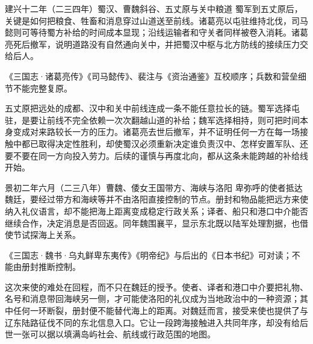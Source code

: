 \begin{event}{}{建兴十二年（二三四年）}{蜀汉、曹魏}{斜谷、五丈原与关中粮道}
蜀军到五丈原后，关键是如何把粮食、牲畜和消息穿过山道送至前线。诸葛亮以屯驻维持北伐，司马懿则可等待蜀方补给的时间成本显现；沿线运输者和守关者同样被卷入消耗。诸葛亮死后撤军，说明道路没有自然通向关中，并把蜀汉中枢与北方防线的接续压力交给后人。

\begin{sourcenote}
《三国志·诸葛亮传》《司马懿传》、裴注与《资治通鉴》互校顺序；兵数和营垒细节不能完整复原。
\end{sourcenote}

五丈原把远处的成都、汉中和关中前线连成一条不能任意拉长的链。蜀军选择屯驻，是要让前线不完全依赖一次次翻越山道的补给；魏军选择相持，则可把时间本身变成对来路较长一方的压力。诸葛亮去世后撤军，并不证明任何一方在每一场接触中都已取得决定性胜利，却使蜀汉必须重新决定谁负责汉中、怎样安置军队、还要不要在同一方向投入劳力。后续的谨慎与再度北向，都从这条未能跨越的补给线开始。
\end{event}

\begin{event}{}{景初二年六月（二三八年）}{曹魏、倭女王国}{带方、海峡与洛阳}
卑弥呼的使者抵达魏廷，要经过带方和海峡等并不由洛阳直接控制的节点。册封和物品能把远方来使纳入礼仪语言，却不能把海上距离变成稳定行政关系；译者、船只和港口中介能否继续合作，决定消息是否回返。同年魏围襄平，显示东北既以陆军处理割据，也借使节试探海上关系。

\begin{sourcenote}[魏廷的册封不等于跨海控制]
《三国志·魏书·乌丸鲜卑东夷传》《明帝纪》与后出的《日本书纪》可对读；不能由册封推断控制。
\end{sourcenote}

这次来使的难处在回程，而不只在魏廷的授予。使者、译者和港口中介要把礼物、名号和消息带回海峡另一侧，才可能使洛阳的礼仪成为当地政治中的一种资源；其中任何一环断裂，册封便不能替代海上的距离。对魏廷而言，接受来使也提供了与辽东陆路征伐不同的东北信息入口。它让一段跨海接触进入共同年序，却没有给后世一张可以据以填满岛屿社会、航线或行政范围的地图。
\end{event}

